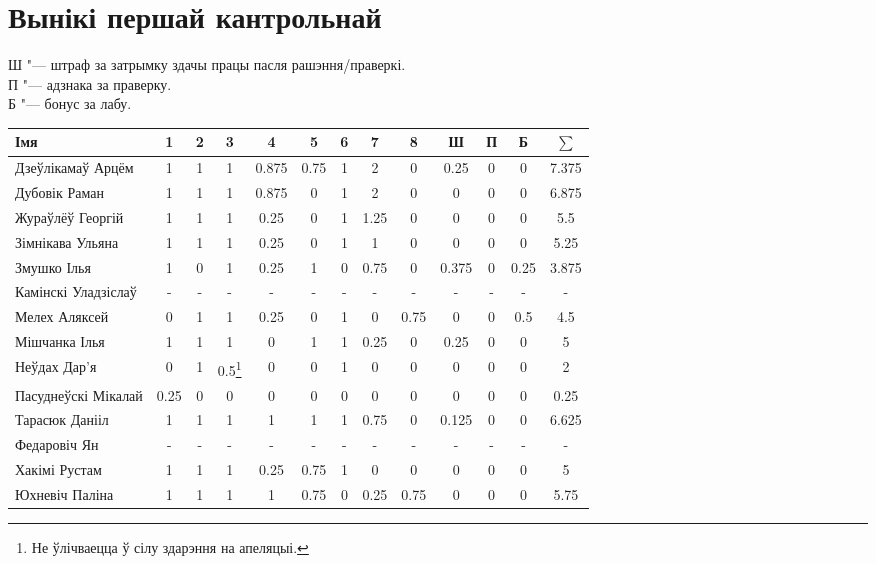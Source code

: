

\renewcommand\thempfootnote{\arabic{mpfootnote}}


	\section{Вынікі першай кантрольнай}
	\noindent Ш "--- штраф за затрымку здачы працы пасля рашэння/праверкі. \\
	П "--- адзнака за праверку. \\
	Б "--- бонус за лабу.
\begin{table}[H]
	\begin{minipage}{\textwidth}
		\begin{tabular}{|l|c|c|c|c|c|c|c|c|c|c|c|c|}
			\hline
			Імя                 & 1 & 2   & 3   & 4    & 5    & 6 & 7   & 8    & Ш   & П    & Б    & $\sum$ \\ \hline
			Дзеўлікамаў Арцём & 1 & 1 & 1 & 0.875 & 0.75 & 1 & 2 & 0 & 0.25 & 0 & 0 & 7.375 \\ \hline
			Дубовік Раман & 1 & 1 & 1 & 0.875 & 0 & 1 & 2 & 0 & 0 & 0 & 0 & 6.875 \\ \hline
			Жураўлёў Георгій & 1 & 1 & 1 & 0.25 & 0 & 1 & 1.25 & 0 & 0 & 0 & 0 & 5.5 \\ \hline
			Зімнікава Ульяна & 1 & 1 & 1  & 0.25 & 0 & 1 & 1 & 0 & 0 & 0 &  0 & 5.25 \\ \hline
			Змушко Ілья & 1 & 0 & 1 & 0.25 & 1 & 0 & 0.75 & 0 & 0.375 & 0 & 0.25 & 3.875 \\ \hline
			Камінскі Уладзіслаў & - & - & - & - & - & - & - & - & - & - & - & - \\ \hline
			Мелех Аляксей & 0 & 1 & 1 & 0.25 & 0 & 1 & 0 & 0.75 & 0 & 0 & 0.5 & 4.5 \\ \hline
			Мішчанка Ілья & 1 & 1 & 1 & 0 & 1 & 1 & 0.25 & 0 & 0.25 & 0 & 0 & 5 \\ \hline
			Неўдах Дар'я & 0 & 1 & 0.5\footnote{Не ўлічваецца ў сілу здарэння на апеляцыі.} & 0 & 0 & 1 & 0 & 0 & 0 & 0 & 0 & 2 \\ \hline
			Пасуднеўскі Мікалай & 0.25 & 0 & 0 & 0 & 0 & 0 & 0 & 0 & 0 & 0 & 0 & 0.25 \\ \hline
			Тарасюк Данііл & 1 & 1 & 1 & 1 & 1 & 1 & 0.75 & 0 & 0.125 & 0 & 0 & 6.625 \\ \hline
			Федаровіч Ян & - & - & - & - & - & - & - & - & - & - & - & - \\ \hline
			Хакімі Рустам & 1 & 1 & 1 & 0.25 & 0.75 & 1 & 0 & 0 & 0 & 0 & 0 & 5 \\ \hline
			Юхневіч Паліна & 1 & 1 & 1 & 1 & 0.75 & 0 & 0.25 & 0.75 & 0 & 0 & 0 & 5.75 \\ \hline
		\end{tabular}
	\end{minipage}
\end{table}

